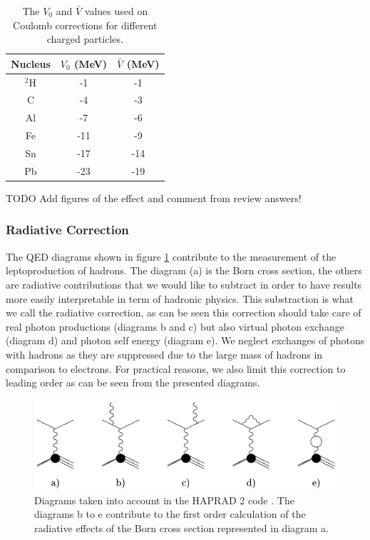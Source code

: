 \begin{table}[htbp]
  \centering
  \begin{tabular}{@{} ccc @{}}
    \hline 
Nucleus & $V_0$ (MeV)  &  $\bar V$ (MeV) \\ \hline
$^2$H & -1 &   -1 \\
C   &  -4 &    -3 \\
Al  &  -7 &    -6 \\
Fe  & -11 &    -9 \\
Sn  & -17 &   -14 \\
Pb  & -23 &   -19 \\
    \hline
  \end{tabular}
  \caption{The $V_0$ and $\bar V$ values used on Coulomb corrections for different charged particles.}
  \label{tab:Coulomb}
\end{table}

TODO Add figures of the effect and comment from review answers!

\subsubsection{Radiative Correction}
\label{RadCor}

The QED diagrams shown in figure \ref{fig:FDRadCorr} contribute to the measurement
of the leptoproduction of hadrons. The diagram (a) is the Born cross section, the
others are radiative contributions that we would like to subtract in order to 
have results more easily interpretable in term of hadronic physics.
This substraction is what we call the radiative correction, as can be seen 
this correction should take care of real photon productions (diagrams b and c)
but also virtual photon exchange (diagram d) and photon self energy (diagram e).
We neglect exchanges of photons with hadrons as they are suppressed due to the 
large mass of hadrons in comparison to electrons. For practical reasons, we also 
limit this correction to leading order as can be seen from the presented diagrams.

\begin{figure}[htp]
\centering
\includegraphics[width=12cm] {chap5-fig/RadDiag.png}
\caption {Diagrams taken into account in the HAPRAD 2 code \cite{Akushevich:2007jc}. The 
diagrams b to e contribute to the first order calculation of the radiative 
effects of the Born cross section represented in diagram a.}
\label{fig:FDRadCorr}
\end{figure}

